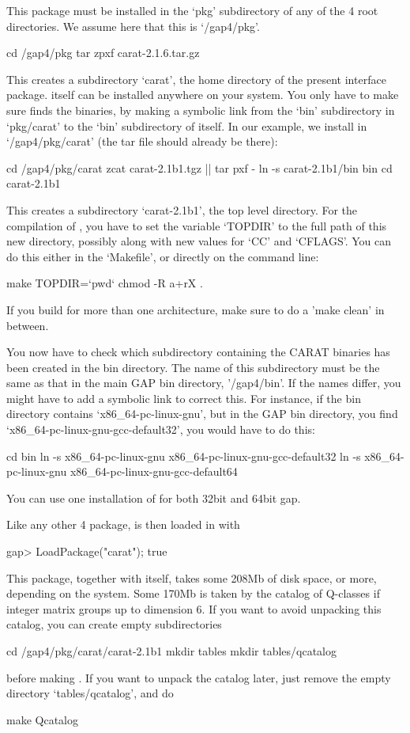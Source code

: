 
This package must be installed in the `pkg' subdirectory of any of
the {\GAP} 4 root directories. We assume here that this is `/gap4/pkg'.

\begintt
cd /gap4/pkg
tar zpxf carat-2.1.6.tar.gz
\endtt

This creates a subdirectory `carat', the home directory of the present
interface package. {\CARAT} itself can be installed anywhere on your 
system. You only have to make sure {\GAP} finds the {\CARAT} binaries, 
by making a symbolic link from the `bin' subdirectory in `pkg/carat' to 
the `bin' subdirectory of {\CARAT} itself. In our example, we install 
{\CARAT} in `/gap4/pkg/carat' (the {\CARAT} tar file should already be 
there):

\begintt
cd /gap4/pkg/carat
zcat carat-2.1b1.tgz || tar pxf -
ln -s carat-2.1b1/bin bin
cd carat-2.1b1
\endtt

This creates a subdirectory `carat-2.1b1', the {\CARAT} top level directory. 
For the compilation of {\CARAT}, you have to set the variable `TOPDIR' to the 
full path of this new directory, possibly along with new values for `CC' and 
`CFLAGS'. You can do this either in the `Makefile', or directly on the command 
line:

\begintt
make TOPDIR=`pwd`
chmod -R a+rX .
\endtt

If you build for more than one architecture, make sure to do a 
'make clean' in between.

You now have to check which subdirectory containing the CARAT 
binaries has been created in the bin directory. The name of this
subdirectory must be the same as that in the main GAP bin directory,
'/gap4/bin'. If the names differ, you might have to add a symbolic
link to correct this. For instance, if the {\CARAT} bin directory
contains `x86_64-pc-linux-gnu', but in the GAP bin directory, you find 
`x86_64-pc-linux-gnu-gcc-default32', you would have to do this:

\begintt
cd bin
ln -s x86_64-pc-linux-gnu x86_64-pc-linux-gnu-gcc-default32
ln -s x86_64-pc-linux-gnu x86_64-pc-linux-gnu-gcc-default64
\endtt

You can use one installation of {\CARAT} for both 32bit and 64bit gap.

Like any other {\GAP} 4 package, {\CARAT} is then loaded in {\GAP} with

\beginexample
gap> LoadPackage("carat");
true
\endexample

This package, together with {\CARAT} itself, takes some 208Mb of disk space,
or more, depending on the system. Some 170Mb is taken by the catalog
of Q-classes if integer matrix groups up to dimension 6. If you want
to avoid unpacking this catalog, you can create empty subdirectories

\begintt
cd /gap4/pkg/carat/carat-2.1b1
mkdir tables
mkdir tables/qcatalog
\endtt

before making {\CARAT}. If you want to unpack the catalog later, just
remove the empty directory `tables/qcatalog', and do

\begintt
make Qcatalog
\endtt

